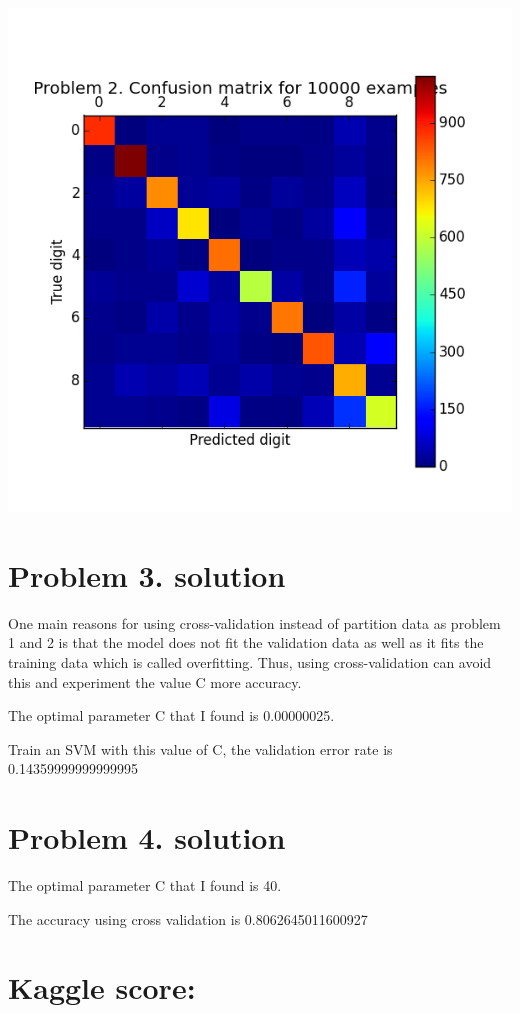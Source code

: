 \documentclass[11pt]{article}
\begin{document}
\includegraphics[scale=0.6]{figure8}

\newpage
\section*{Problem 3. solution}
One main reasons for using cross-validation instead of partition data as problem 1 and 2 is that the model does not fit the validation data as well as it fits the training data which is called overfitting. Thus, using cross-validation can avoid this and experiment the value C more accuracy.

The optimal parameter C that I found is 0.00000025.

Train an SVM with this value of C, the validation error rate is 0.14359999999999995

\section*{Problem 4. solution}
The optimal parameter C that I found is 40.

The accuracy using cross validation is 0.8062645011600927



\section*{Kaggle score:}
\end{document}
